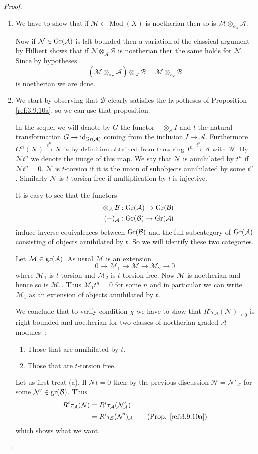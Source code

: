 \documentclass{amsproc}
\def\Ascr{{\mathcal A}}
\def\Bscr{{\mathcal B}}
\def\Mscr{{\mathcal M}}
\def\Nscr{{\mathcal N}}
\def\Id{\text{id}}
\def\gr{\mathop{\text{gr}}}
\def\Gr{\mathop{\text{Gr}}}
\def\gr{\operatorname {gr}}
\def\gr{\operatorname {gr}}
\def\Qch{\operatorname {Mod}}
\def\r{\rightarrow}
\let\oldtext\text
\def\text#1{\oldtext{\upshape #1}}
\theoremstyle{definition}
\theoremstyle{remark}
\numberwithin{equation}{section}
\numberwithin{table}{section}
\numberwithin{figure}{section}
\def\gr{\mathop{\text{gr}}}
\def\Gr{\mathop{\text{Gr}}}
\begin{document}
\begin{proof}
\begin{enumerate}
\item
We have to show that if $\Mscr\in\Qch(X)$ is noetherian then so is
$\Mscr\otimes_{o_X}\Ascr$.

Now if $\Nscr\in\Gr(\Ascr)$ is left bounded then a variation of the classical
argument by Hilbert shows that if $\Nscr\otimes_\Ascr\Bscr$ is noetherian
then the same holds for $\Nscr$. Since by hypotheses
\[
(\Mscr\otimes_{o_X}\Ascr)\otimes_\Ascr\Bscr=\Mscr\otimes_{o_X}\Bscr
\]
is noetherian we are done.
\item
We start by observing that $\Bscr$ clearly satisfies the hypotheses of
Proposition \ref{ref:3.9.10a}, so we can use that proposition. 

In the sequel we will denote by $G$ the functor $-\otimes_\Ascr I$ and
$t$ the natural transformation $G\r \Id_{\Gr(\Ascr)}$ coming from the
inclusion $I\r \Ascr$.  Furthermore $G^n(\Nscr)\xrightarrow {t^n}
\Nscr$ is by definition obtained from tensoring
$I^n\xrightarrow{t^n}\Ascr$ with $\Nscr$. By $\Nscr t^n$ we denote the
image of this map. We say that $\Nscr$ is annihilated by $t^n$ if
$\Nscr t^n=0$. $\Nscr$ is $t$-torsion if it is the union of subobjects
annihilated by some $t^n$. Similarly $\Nscr$ is $t$-torsion free if
multiplication by $t$ is injective.

It is easy to see that the functors
\begin{align*}
-\otimes_\Ascr\Bscr&:\Gr(\Ascr)\r \Gr(\Bscr)\\
(-)_\Ascr&:\Gr(\Bscr)\r \Gr(\Ascr)
\end{align*}
induce inverse equivalences between $\Gr(\Bscr)$ and the full subcategory of
$\Gr(\Ascr)$ consisting of objects annihilated by $t$. So we will identify
these two categories.

Let $\Mscr\in\gr(\Ascr)$. As usual $\Mscr$ is an extension
\[
0\r\Mscr_1\r \Mscr\r \Mscr_2\r 0
\]
where $\Mscr_1$ is $t$-torsion and $\Mscr_2$ is $t$-torsion free. Now
$\Mscr$ is  noetherian and hence so is $\Mscr_1$. Thus $\Mscr_1t^n=0$ for some
$n$ and in particular we can write $\Mscr_1$ as an extension of
objects annihilated by $t$.


We conclude that to verify condition $\chi$ we have to show that
$R^i\tau_\Ascr(\Nscr)_{\ge 0}$ is right bounded and noetherian for two
classes of noetherian graded $\Ascr$-modules~:
\begin{enumerate}
\item 
Those that are annihilated by $t$.
\item 
Those that are $t$-torsion free.
\end{enumerate}
Let us first treat (a). If $\Nscr t=0$ then by the previous discussion
$\Nscr=\Nscr'_\Ascr$ for some $\Nscr'\in\gr(\Bscr)$. Thus
\begin{align*}
R^i\tau_\Ascr(\Nscr)&=R^i\tau_\Ascr(\Nscr'_\Ascr)\\
&=R^i\tau_\Bscr(\Nscr')_\Ascr  \qquad(\text{Prop. \ref{ref:3.9.10a}})
\end{align*}
which shows what we want.


\end{enumerate}
\end{proof}
\end{document}
